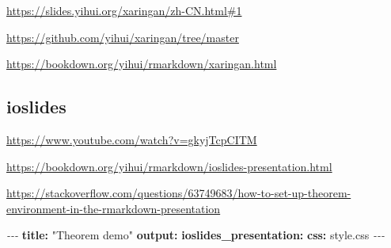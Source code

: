 \documentclass[
]{book}
\newenvironment{Shaded}{\begin{snugshade}}{\end{snugshade}}
\newcommand{\AttributeTok}[1]{\textcolor[rgb]{0.13,0.29,0.53}{#1}}
\newcommand{\FunctionTok}[1]{\textcolor[rgb]{0.13,0.29,0.53}{\textbf{#1}}}
\newcommand{\KeywordTok}[1]{\textcolor[rgb]{0.13,0.29,0.53}{\textbf{#1}}}
\newcommand{\PreprocessorTok}[1]{\textcolor[rgb]{0.56,0.35,0.01}{\textit{#1}}}
\newcommand{\StringTok}[1]{\textcolor[rgb]{0.31,0.60,0.02}{#1}}
\theoremstyle{definition}
\theoremstyle{definition}
\theoremstyle{definition}
\theoremstyle{definition}
\theoremstyle{remark}
\begin{document}
\url{https://slides.yihui.org/xaringan/zh-CN.html\#1}

\url{https://github.com/yihui/xaringan/tree/master}

\url{https://bookdown.org/yihui/rmarkdown/xaringan.html}

\subsection{ioslides}\label{ioslides}

\url{https://www.youtube.com/watch?v=gkyjTcpCITM}

\url{https://bookdown.org/yihui/rmarkdown/ioslides-presentation.html}

\url{https://stackoverflow.com/questions/63749683/how-to-set-up-theorem-environment-in-the-rmarkdown-presentation}

\begin{Shaded}
\begin{Highlighting}[]
\PreprocessorTok{{-}{-}{-}}
\FunctionTok{title}\KeywordTok{:}\AttributeTok{ }\StringTok{"Theorem demo"}
\FunctionTok{output}\KeywordTok{:}
\AttributeTok{  }\FunctionTok{ioslides\_presentation}\KeywordTok{:}
\AttributeTok{    }\FunctionTok{css}\KeywordTok{:}\AttributeTok{ style.css}
\PreprocessorTok{{-}{-}{-}}
\end{Highlighting}
\end{Shaded}
\end{document}
